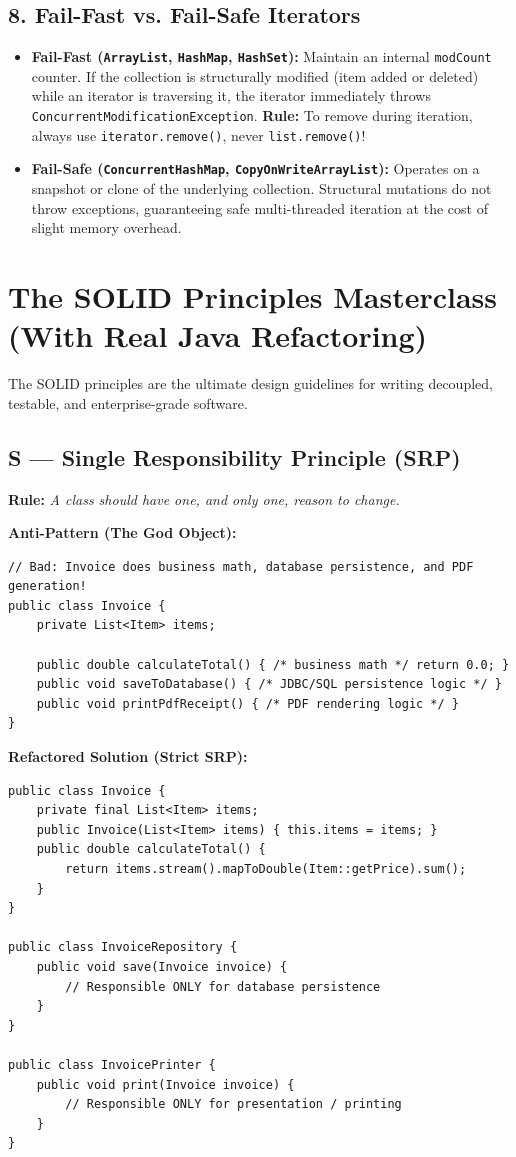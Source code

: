 \documentclass[10pt,journal,compsoc,onecolumn]{IEEEtran}
\begin{document}
\subsection{8. Fail-Fast vs. Fail-Safe Iterators}
\begin{itemize}
    \item \textbf{Fail-Fast (\texttt{ArrayList}, \texttt{HashMap}, \texttt{HashSet}):} Maintain an internal \texttt{modCount} counter. If the collection is structurally modified (item added or deleted) while an iterator is traversing it, the iterator immediately throws \texttt{ConcurrentModificationException}. \textbf{Rule:} To remove during iteration, always use \texttt{iterator.remove()}, never \texttt{list.remove()}!
    \item \textbf{Fail-Safe (\texttt{ConcurrentHashMap}, \texttt{CopyOnWriteArrayList}):} Operates on a snapshot or clone of the underlying collection. Structural mutations do not throw exceptions, guaranteeing safe multi-threaded iteration at the cost of slight memory overhead.
\end{itemize}

\section{The SOLID Principles Masterclass (With Real Java Refactoring)}
\label{sec:solid}

The SOLID principles are the ultimate design guidelines for writing decoupled, testable, and enterprise-grade software.

\subsection{S --- Single Responsibility Principle (SRP)}
\textbf{Rule:} \emph{A class should have one, and only one, reason to change.}

\textbf{Anti-Pattern (The God Object):}
\begin{verbatim}
// Bad: Invoice does business math, database persistence, and PDF generation!
public class Invoice {
    private List<Item> items;

    public double calculateTotal() { /* business math */ return 0.0; }
    public void saveToDatabase() { /* JDBC/SQL persistence logic */ }
    public void printPdfReceipt() { /* PDF rendering logic */ }
}
\end{verbatim}

\textbf{Refactored Solution (Strict SRP):}
\begin{verbatim}
public class Invoice {
    private final List<Item> items;
    public Invoice(List<Item> items) { this.items = items; }
    public double calculateTotal() {
        return items.stream().mapToDouble(Item::getPrice).sum();
    }
}

public class InvoiceRepository {
    public void save(Invoice invoice) {
        // Responsible ONLY for database persistence
    }
}

public class InvoicePrinter {
    public void print(Invoice invoice) {
        // Responsible ONLY for presentation / printing
    }
}
\end{verbatim}
\end{document}
